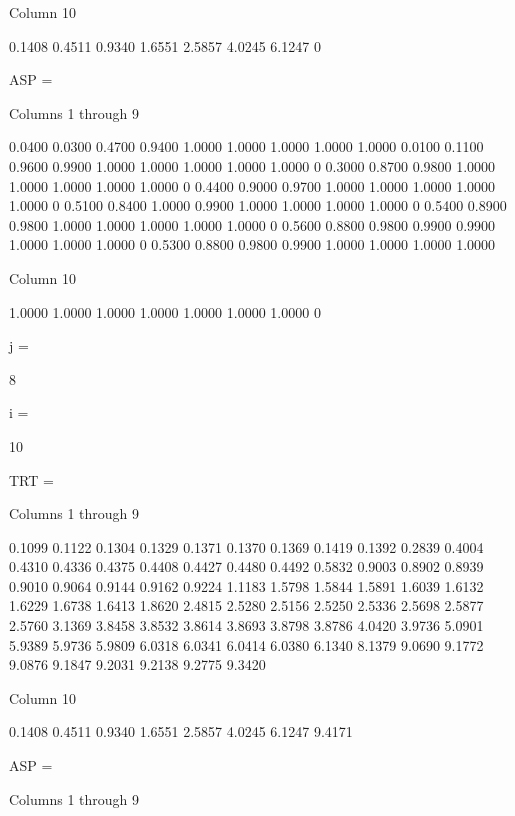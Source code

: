   Column 10

    0.1408
    0.4511
    0.9340
    1.6551
    2.5857
    4.0245
    6.1247
         0


ASP =

  Columns 1 through 9

    0.0400    0.0300    0.4700    0.9400    1.0000    1.0000    1.0000    1.0000    1.0000
    0.0100    0.1100    0.9600    0.9900    1.0000    1.0000    1.0000    1.0000    1.0000
         0    0.3000    0.8700    0.9800    1.0000    1.0000    1.0000    1.0000    1.0000
         0    0.4400    0.9000    0.9700    1.0000    1.0000    1.0000    1.0000    1.0000
         0    0.5100    0.8400    1.0000    0.9900    1.0000    1.0000    1.0000    1.0000
         0    0.5400    0.8900    0.9800    1.0000    1.0000    1.0000    1.0000    1.0000
         0    0.5600    0.8800    0.9800    0.9900    0.9900    1.0000    1.0000    1.0000
         0    0.5300    0.8800    0.9800    0.9900    1.0000    1.0000    1.0000    1.0000

  Column 10

    1.0000
    1.0000
    1.0000
    1.0000
    1.0000
    1.0000
    1.0000
         0


j =

     8


i =

    10


TRT =

  Columns 1 through 9

    0.1099    0.1122    0.1304    0.1329    0.1371    0.1370    0.1369    0.1419    0.1392
    0.2839    0.4004    0.4310    0.4336    0.4375    0.4408    0.4427    0.4480    0.4492
    0.5832    0.9003    0.8902    0.8939    0.9010    0.9064    0.9144    0.9162    0.9224
    1.1183    1.5798    1.5844    1.5891    1.6039    1.6132    1.6229    1.6738    1.6413
    1.8620    2.4815    2.5280    2.5156    2.5250    2.5336    2.5698    2.5877    2.5760
    3.1369    3.8458    3.8532    3.8614    3.8693    3.8798    3.8786    4.0420    3.9736
    5.0901    5.9389    5.9736    5.9809    6.0318    6.0341    6.0414    6.0380    6.1340
    8.1379    9.0690    9.1772    9.0876    9.1847    9.2031    9.2138    9.2775    9.3420

  Column 10

    0.1408
    0.4511
    0.9340
    1.6551
    2.5857
    4.0245
    6.1247
    9.4171


ASP =

  Columns 1 through 9

